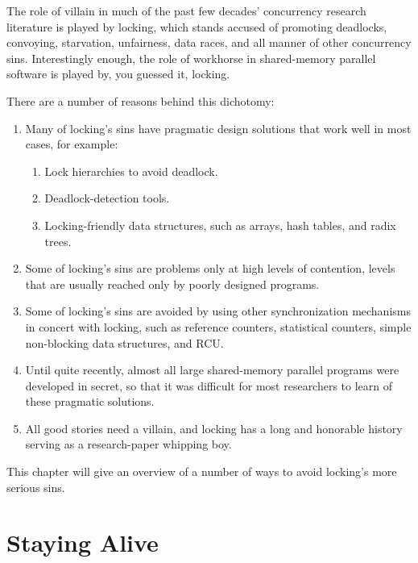 

The role of villain in much of the past few decades' concurrency research
literature is played by locking,
which stands accused of promoting deadlocks, convoying, starvation,
unfairness, data races, and all manner of other concurrency sins.
Interestingly enough, the role of workhorse in shared-memory parallel
software is played by, you guessed it, locking.

There are a number of reasons behind this dichotomy:

\begin{enumerate}
\item	Many of locking's sins have pragmatic design solutions that
	work well in most cases, for example:
	\begin{enumerate}
	\item	Lock hierarchies to avoid deadlock.
	\item	Deadlock-detection tools.
	\item	Locking-friendly data structures, such as
		arrays, hash tables, and radix trees.
	\end{enumerate}
\item	Some of locking's sins are problems only at high levels of
	contention, levels that are usually reached only by poorly
	designed programs.
\item	Some of locking's sins are avoided by using other synchronization
	mechanisms in concert with locking, such as reference counters,
	statistical counters, simple non-blocking data structures, and RCU.
\item	Until quite recently, almost all large shared-memory parallel
	programs were developed in secret, so that it was difficult for
	most researchers to learn of these pragmatic solutions.
\item	All good stories need a villain, and locking has a long and
	honorable history serving as a research-paper whipping boy.
\end{enumerate}

This chapter will give an overview of a number of ways to avoid locking's
more serious sins.


\section{Staying Alive}
\label{sec:locking:Staying Alive}

